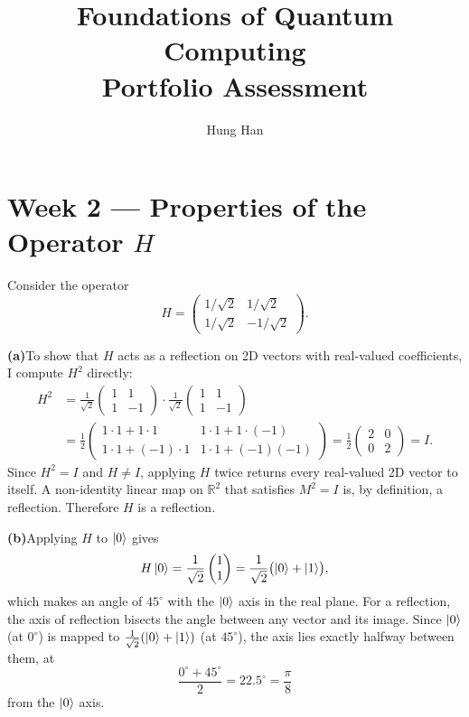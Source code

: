 \documentclass[12pt,a4paper]{article}
\title{\textbf{Foundations of Quantum Computing}\\[0.5em]
       \large Portfolio Assessment}
\author{Hung Han}
\date{}
\begin{document}
\maketitle
\thispagestyle{empty}

\section*{Week 2 --- Properties of the Operator $H$}

Consider the operator
\[
  H = \begin{pmatrix} 1/\sqrt{2} & 1/\sqrt{2} \\ 1/\sqrt{2} & -1/\sqrt{2} \end{pmatrix}.
\]

\medskip
\noindent\textbf{(a)}\enspace To show that $H$ acts as a reflection on 2D vectors with real-valued coefficients, I compute $H^2$ directly:
\begin{align*}
H^2
  &= \frac{1}{\sqrt{2}}\begin{pmatrix}1&1\\1&-1\end{pmatrix}
     \cdot\frac{1}{\sqrt{2}}\begin{pmatrix}1&1\\1&-1\end{pmatrix} \\[4pt]
  &= \frac{1}{2}\begin{pmatrix}1{\cdot}1+1{\cdot}1 & 1{\cdot}1+1{\cdot}(-1)\\
                               1{\cdot}1+(-1){\cdot}1 & 1{\cdot}1+(-1)(-1)\end{pmatrix}
   = \frac{1}{2}\begin{pmatrix}2&0\\0&2\end{pmatrix}
   = I.
\end{align*}
Since $H^2 = I$ and $H\neq I$, applying $H$ twice returns every real-valued 2D vector to itself. A non-identity linear map on $\mathbb{R}^2$ that satisfies $M^2 = I$ is, by definition, a reflection. Therefore $H$ is a reflection.

\medskip
\noindent\textbf{(b)}\enspace Applying $H$ to $\ket{0}$ gives
\[
  H\ket{0} = \frac{1}{\sqrt{2}}\begin{pmatrix}1\\1\end{pmatrix}
           = \frac{1}{\sqrt{2}}\bigl(\ket{0}+\ket{1}\bigr),
\]
which makes an angle of $45^\circ$ with the $\ket{0}$ axis in the real plane.
For a reflection, the axis of reflection bisects the angle between any vector and its image.
Since $\ket{0}$ (at $0^\circ$) is mapped to $\tfrac{1}{\sqrt{2}}(\ket{0}+\ket{1})$ (at $45^\circ$), the axis lies exactly halfway between them, at
\[
  \frac{0^\circ + 45^\circ}{2} = 22.5^\circ = \frac{\pi}{8}
\]
from the $\ket{0}$ axis.
\end{document}

